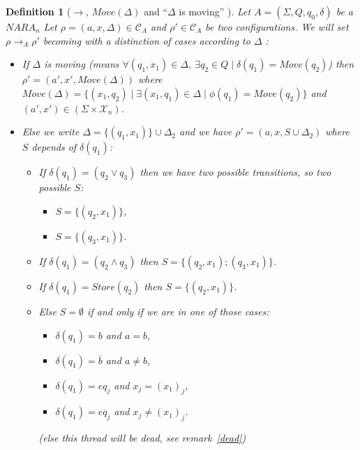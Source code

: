 \documentclass[a4paper,10pt]{report}
\newtheorem{df}{Definition}
\newcommand{\C}{\mathcal{C}_{A}}
\newcommand{\X}{\mathcal{X}_{n}}
\begin{document}
\begin{df}[$\rightarrow$, $Move(\Delta)$ and ``$\Delta$ is moving'' ]
  Let $A = (\Sigma ,Q ,q_0, \delta )$ be a $NARA_n$
  Let $\rho = (a,x,\Delta) \in \C$ and $\rho' \in \C$ be two configurations.
  We will set  $\rho \rightarrow_A \rho'$  becoming with a distinction of cases according to $\Delta$ : 
   \begin{itemize}
    \item [${\xrightarrow{(a',x')}}_M$ (move)] If $\Delta$ is moving (means $\forall (q_1,x_1) \in \Delta, \ \exists q_2 \in Q \mid \delta(q_1) = Move(q_2)$)
    then $\rho'  = (a',x',Move(\Delta))$ 
    where $Move(\Delta) = \{(x_1,q_2) \mid \exists (x_1,q_1) \in \Delta \mid \phi(q_1) = Move(q_2)\}$ and $(a',x') \in (\Sigma \times \X)$.

    \item [$\rightarrow_{\epsilon}$ (epsilon)  ] Else we write $\Delta = \{(q_1,x_1)\} \cup \Delta_2$ and we have  $\rho' = (a,x,S \cup \Delta_2 )$ where $S$ depends of $\delta(q_1)$:  
    \begin{itemize}
    \item [$\rightarrow_\vee$ (or)] If $\delta(q_1) = (q_2 \vee q_3)$  then we have two possible transitions, so two possible $S$:
      \begin{itemize}
	\item $S = \{ (q_2,x_1)\}$,   
	\item $S = \{(q_3,x_1) \}$.
      \end{itemize}
    \item [$\rightarrow_\wedge$ (and)] If $\delta(q_1) = (q_2 \wedge q_3)$  then $S = \{(q_2,x_1); (q_3,x_1) \} $.
    \item [$\rightarrow_s$ (store)] If $\delta(q_1) = Store(q_2)$  then $S =  \{(q_2,x_1)\}$.
 
    \item [$\rightarrow_c$ (check)] Else $S = \emptyset$ if and only if we are in one of those cases:  
	\begin{itemize}
 	 \item $\delta(q_1) = b$ and $ a= b$,
 	 \item $\delta(q_1) = \overline b$ and $ a \neq b$,
 	 \item $\delta(q_1) = eq_j$ and $x_j = {(x_1)}_j$,
 	 \item $\delta(q_1) = \overline{eq_j}$ and $x_j \neq {(x_1)}_j$.
	\end{itemize}
	 (else this thread will be dead, see remark~\ref{dead})
    \end{itemize}
   

    
   \end{itemize}


\end{df}
\end{document}
